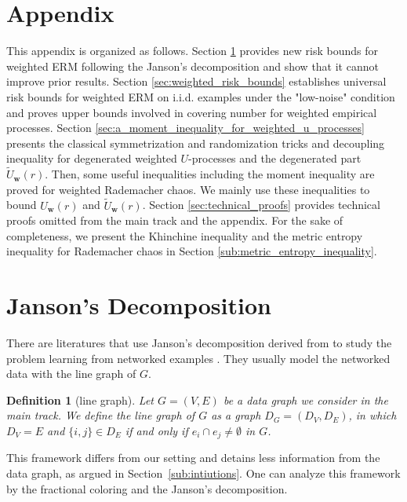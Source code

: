 \documentclass[letterpaper]{article} %
\newtheorem{definition}{Definition}
\newcommand{\weight}{\mathbf{w}}
\newcommand{\edge}[1]{\{#1\}}
\newcommand{\red}[1]{\textcolor{red}{#1}}
\newcommand{\todo}[1]{\red{\textsc{todo:} #1}}
\begin{document}


\newpage \newpage

\section*{Appendix} %
\appendix
\label{sec:appendix}

This appendix is organized as follows. Section \ref{sec:fractional_coloring_approach} 
provides new risk bounds for weighted ERM following the Janson's decomposition and show that it cannot improve prior results. 
Section \ref{sec:weighted_risk_bounds} establishes universal risk bounds for weighted ERM on i.i.d. examples under the "low-noise" condition and proves upper bounds involved in covering number for weighted empirical processes. 
Section \ref{sec:a_moment_inequality_for_weighted_u_processes} presents the classical symmetrization and randomization tricks and decoupling inequality for degenerated weighted $U$-processes and the degenerated part $\widetilde{U}_\weight{}(r)$.
Then, some useful inequalities including the moment inequality are proved for weighted Rademacher chaos.
We mainly use these inequalities to bound $U_\weight{}(r)$ and $\widetilde{U}_\weight{}(r)$.
Section \ref{sec:technical_proofs} provides technical proofs omitted from the main track and the appendix.
For the sake of completeness, we present the Khinchine inequality and the metric entropy inequality for Rademacher chaos in Section \ref{sub:metric_entropy_inequality}.

\section{Janson's Decomposition} %
\label{sec:fractional_coloring_approach}

There are literatures that use Janson's decomposition derived from \cite{janson2004large} to study the problem learning from networked examples \cite{Usunier2005,Biau2006,ralaivola2009chromatic,DBLP:conf/icml/RalaivolaA15}.
They usually model the networked data with the line graph of $G$.
\begin{definition}[line graph]
  \label{de:line graph}
  Let $G=(V,E)$ be a data graph we consider in the main track. We define the line graph of $G$ as a graph $D_G = (D_V, D_E)$, in which $D_V = E$ and $\edge{i,j}\in D_E$ if and only if $e_i\cap e_j\neq\emptyset$ in $G$.
\end{definition}
This framework differs from our setting and detains less information from the data graph, as argued in Section~\ref{sub:intiutions}. 
One can analyze this framework by the fractional coloring and the Janson's decomposition.
\end{document}
